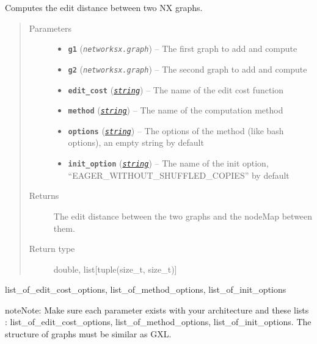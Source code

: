 \documentclass[letterpaper,10pt,english]{sphinxmanual}
\begin{document}
\begin{fulllineitems}
\label{doc:gedlibpy.compute_ged_on_two_graphs}
Computes the edit distance between two NX graphs.
\begin{quote}\begin{description}
\item[{Parameters}] \leavevmode\begin{itemize}
\item {} 
\textbf{\texttt{g1}} (\emph{\texttt{networksx.graph}}) -- The first graph to add and compute

\item {} 
\textbf{\texttt{g2}} (\emph{\texttt{networksx.graph}}) -- The second graph to add and compute

\item {} 
\textbf{\texttt{edit\_cost}} (\href{https://docs.python.org/3/library/string.html\#module-string}{\emph{\texttt{string}}}) -- The name of the edit cost function

\item {} 
\textbf{\texttt{method}} (\href{https://docs.python.org/3/library/string.html\#module-string}{\emph{\texttt{string}}}) -- The name of the computation method

\item {} 
\textbf{\texttt{options}} (\href{https://docs.python.org/3/library/string.html\#module-string}{\emph{\texttt{string}}}) -- The options of the method (like bash options), an empty string by default

\item {} 
\textbf{\texttt{init\_option}} (\href{https://docs.python.org/3/library/string.html\#module-string}{\emph{\texttt{string}}}) -- The name of the init option, ``EAGER\_WITHOUT\_SHUFFLED\_COPIES'' by default

\end{itemize}

\item[{Returns}] \leavevmode
The edit distance between the two graphs and the nodeMap between them.

\item[{Return type}] \leavevmode
double, list{[}tuple(size\_t, size\_t){]}

\end{description}\end{quote}




list\_of\_edit\_cost\_options, list\_of\_method\_options, list\_of\_init\_options



\begin{notice}{note}{Note:}
Make sure each parameter exists with your architecture and these lists :  list\_of\_edit\_cost\_options, list\_of\_method\_options, list\_of\_init\_options. The structure of graphs must be similar as GXL.
\end{notice}

\end{fulllineitems}
\end{document}
